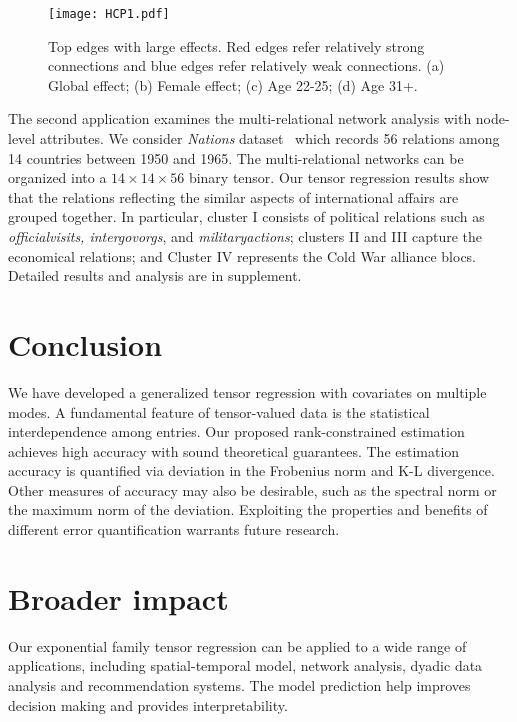 \documentclass{article}
\theoremstyle{plain}
\theoremstyle{definition}
\begin{document}
\begin{figure}[ht]
\centering
\vspace{-.2cm}
\texttt{[image: HCP1.pdf]}
\caption{\normalsize{Top edges with large effects. Red edges refer relatively strong connections and blue edges refer relatively weak connections. (a) Global effect; (b) Female effect; (c) Age 22-25; (d) Age 31+.} }\label{fig:brain}
\end{figure}
\vspace{-.3cm}
The second application examines the multi-relational network analysis with node-level attributes. We consider \emph{Nations} dataset~\cite{nickel2011three} which records 56 relations among 14 countries between 1950 and 1965. The multi-relational networks can be organized into a $14 \times 14 \times 56$ binary tensor. Our tensor regression results show that the relations reflecting the similar aspects of international affairs are grouped together. In particular, cluster I consists of political relations such as \emph{officialvisits, intergovorgs}, and \emph{militaryactions}; clusters II and III capture the economical relations; and Cluster IV represents the Cold War alliance blocs.  Detailed results and analysis are in supplement.

\vspace{-.3cm}
\section{Conclusion}
\vspace{-.2cm}
We have developed a generalized tensor regression with covariates on multiple modes. A fundamental feature of tensor-valued data is the statistical interdependence among entries. Our proposed rank-constrained estimation achieves high accuracy with sound theoretical guarantees. The estimation accuracy is quantified via deviation in the Frobenius norm and K-L divergence. Other measures of accuracy may also be desirable, such as the spectral norm or the maximum norm of the deviation. Exploiting the properties and benefits of different error quantification warrants future research.

\section*{Broader impact}
Our exponential family tensor regression can be applied to a wide range of applications, including spatial-temporal model, network analysis, dyadic data analysis and recommendation systems. The model prediction help improves decision making and provides interpretability.  
\end{document}
